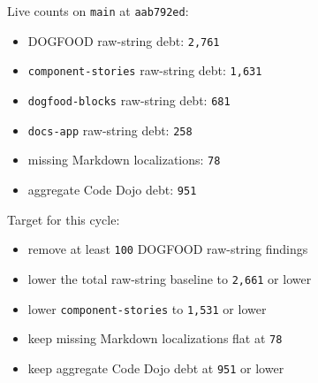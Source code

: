 Live counts on \texttt{m\allowbreak{}a\allowbreak{}i\allowbreak{}n} at \texttt{a\allowbreak{}a\allowbreak{}b\allowbreak{}7\allowbreak{}9\allowbreak{}2\allowbreak{}e\allowbreak{}d}:

\begin{itemize}
\tightlist
\item
  DOGFOOD raw-string debt: \texttt{2\allowbreak{},\allowbreak{}7\allowbreak{}6\allowbreak{}1}
\item
  \texttt{c\allowbreak{}o\allowbreak{}m\allowbreak{}p\allowbreak{}o\allowbreak{}n\allowbreak{}e\allowbreak{}n\allowbreak{}t\allowbreak{}-\allowbreak{}s\allowbreak{}t\allowbreak{}o\allowbreak{}r\allowbreak{}i\allowbreak{}e\allowbreak{}s} raw-string debt: \texttt{1\allowbreak{},\allowbreak{}6\allowbreak{}3\allowbreak{}1}
\item
  \texttt{d\allowbreak{}o\allowbreak{}g\allowbreak{}f\allowbreak{}o\allowbreak{}o\allowbreak{}d\allowbreak{}-\allowbreak{}b\allowbreak{}l\allowbreak{}o\allowbreak{}c\allowbreak{}k\allowbreak{}s} raw-string debt: \texttt{6\allowbreak{}8\allowbreak{}1}
\item
  \texttt{d\allowbreak{}o\allowbreak{}c\allowbreak{}s\allowbreak{}-\allowbreak{}a\allowbreak{}p\allowbreak{}p} raw-string debt: \texttt{2\allowbreak{}5\allowbreak{}8}
\item
  missing Markdown localizations: \texttt{7\allowbreak{}8}
\item
  aggregate Code Dojo debt: \texttt{9\allowbreak{}5\allowbreak{}1}
\end{itemize}

Target for this cycle:

\begin{itemize}
\tightlist
\item
  remove at least \texttt{1\allowbreak{}0\allowbreak{}0} DOGFOOD raw-string findings
\item
  lower the total raw-string baseline to \texttt{2\allowbreak{},\allowbreak{}6\allowbreak{}6\allowbreak{}1} or lower
\item
  lower \texttt{c\allowbreak{}o\allowbreak{}m\allowbreak{}p\allowbreak{}o\allowbreak{}n\allowbreak{}e\allowbreak{}n\allowbreak{}t\allowbreak{}-\allowbreak{}s\allowbreak{}t\allowbreak{}o\allowbreak{}r\allowbreak{}i\allowbreak{}e\allowbreak{}s} to \texttt{1\allowbreak{},\allowbreak{}5\allowbreak{}3\allowbreak{}1} or lower
\item
  keep missing Markdown localizations flat at \texttt{7\allowbreak{}8}
\item
  keep aggregate Code Dojo debt at \texttt{9\allowbreak{}5\allowbreak{}1} or lower
\end{itemize}

